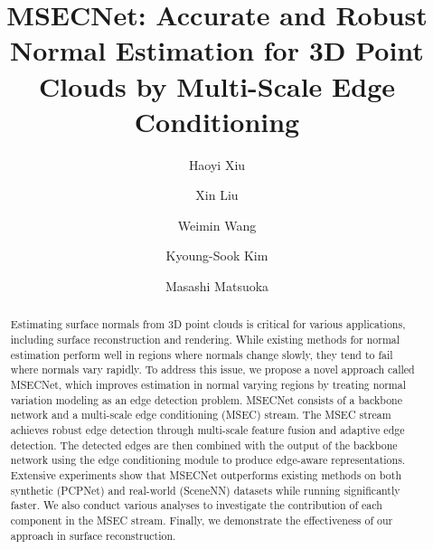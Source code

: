 \documentclass[sigconf]{acmart}
\begin{document}
\title{MSECNet: Accurate and Robust Normal Estimation for 3D Point Clouds by Multi-Scale Edge Conditioning}



\author{Haoyi Xiu}

\author{Xin Liu}



\author{Weimin Wang}
\authornotemark[1]

\author{Kyoung-Sook Kim}

\author{Masashi Matsuoka}

















\renewcommand{\shortauthors}{Haoyi Xiu, Xin Liu, Weimin Wang, Kyoung-Sook Kim, \& Masashi Matsuoka}
\newcommand{\etal}{\textit{et al.}}
\newcommand{\R}{\mathbb{R}}

\begin{abstract}
Estimating surface normals from 3D point clouds is critical for various applications, including surface reconstruction and rendering. While existing methods for normal estimation perform well in regions where normals change slowly, they tend to fail where normals vary rapidly. 
To address this issue, we propose a novel approach called MSECNet, which improves estimation in normal varying regions by treating normal variation modeling as an edge detection problem. MSECNet consists of a backbone network and a multi-scale edge conditioning (MSEC) stream. The MSEC stream achieves robust edge detection through multi-scale feature fusion and adaptive edge detection. The detected edges are then combined with the output of the backbone network using the edge conditioning module to produce edge-aware representations.
Extensive experiments show that MSECNet outperforms existing methods on both synthetic (PCPNet) and real-world (SceneNN) datasets while running significantly faster. We also conduct various analyses to investigate the contribution of each component in the MSEC stream. Finally, we demonstrate the effectiveness of our approach in surface reconstruction.

\end{abstract}
\end{document}
